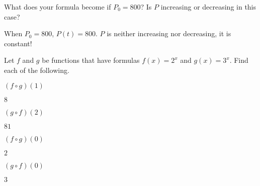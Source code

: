 \begin{exercises}
\begin{problem}
\begin{subproblem}
\begin{shortsolution}
	\end{shortsolution}
\end{subproblem}
\begin{subproblem}
	What does your formula become if $P_0=800$? Is $P$ increasing or decreasing in this case?
	\begin{shortsolution}
		When $P_0=800$, $P(t)=800$. $P$ is neither increasing nor decreasing, it is constant!
	\end{shortsolution}
\end{subproblem}
\end{problem}
\begin{problem}[Composition]
Let $f$ and $g$ be functions that have formulas $f(x)=2^x$ and $g(x)=3^x$. Find each 
of the following.
\begin{multicols}{3}
	\begin{subproblem}[core]
		$(f\circ g)(1)$
		\begin{shortsolution}
			$8$ 
		\end{shortsolution}
	\end{subproblem}
	\begin{subproblem}[core]
		$(g\circ f)(2)$
		\begin{shortsolution}
			$81$ 
		\end{shortsolution}
	\end{subproblem}
	\begin{subproblem}[core]
		$(f\circ g)(0)$
		\begin{shortsolution}
			$2$ 
		\end{shortsolution}
	\end{subproblem}
	\begin{subproblem}
		$(g\circ f)(0)$
		\begin{shortsolution}
			$3$ 
		\end{shortsolution}

\end{subproblem}
\end{multicols}
\end{problem}
\end{exercises}
